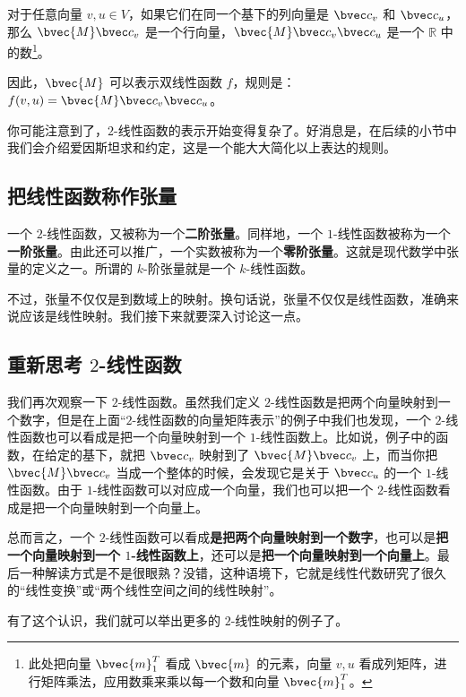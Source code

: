 对于任意向量 ${v}, {u}\in V$，如果它们在同一个基下的列向量是 $\bvec c_v$ 和 $\bvec c_u$，那么 $\bvec{M}\bvec c_v$ 是一个行向量，$\bvec{M}\bvec c_v\bvec c_u$ 是一个 $\mathbb{R}$ 中的数\footnote{此处把向量 $\bvec{m}_1^T$ 看成 $\bvec{m}$ 的元素，向量 ${v}, {u}$ 看成列矩阵，进行矩阵乘法，应用数乘来乘以每一个数和向量 $\bvec{m}_1^T$。}。

因此，$\bvec{M}$ 可以表示双线性函数 $f$，规则是：$f({v}, {u})=\bvec{M}\bvec c_v\bvec c_u$。

你可能注意到了，$2$-线性函数的表示开始变得复杂了。好消息是，在后续的小节中我们会介绍爱因斯坦求和约定，这是一个能大大简化以上表达的规则。

\subsection{把线性函数称作张量}

一个 $2$-线性函数，又被称为一个\textbf{二阶张量}。同样地，一个 $1$-线性函数被称为一个\textbf{一阶张量}。由此还可以推广，一个实数被称为一个\textbf{零阶张量}。这就是现代数学中张量的定义之一。所谓的 $k$-阶张量就是一个 $k$-线性函数。

不过，张量不仅仅是到数域上的映射。换句话说，张量不仅仅是线性函数，准确来说应该是线性映射。我们接下来就要深入讨论这一点。

\subsection{重新思考 $2$-线性函数}

我们再次观察一下 $2$-线性函数。虽然我们定义 $2$-线性函数是把两个向量映射到一个数字，但是在上面“$2$-线性函数的向量矩阵表示”的例子中我们也发现，一个 $2$-线性函数也可以看成是把一个向量映射到一个 $1$-线性函数上。比如说，例子中的函数，在给定的基下，就把 $\bvec c_v$ 映射到了 $\bvec{M}\bvec c_v$ 上，而当你把 $\bvec{M}\bvec c_v$ 当成一个整体的时候，会发现它是关于 $\bvec c_u$ 的一个 $1$-线性函数。由于 $1$-线性函数可以对应成一个向量，我们也可以把一个 $2$-线性函数看成是把一个向量映射到一个向量上。

总而言之，一个 $2$-线性函数可以看成\textbf{是把两个向量映射到一个数字}，也可以是\textbf{把一个向量映射到一个 $1$-线性函数上}，还可以是\textbf{把一个向量映射到一个向量上}。最后一种解读方式是不是很眼熟？没错，这种语境下，它就是线性代数研究了很久的“线性变换”或“两个线性空间之间的线性映射”。

有了这个认识，我们就可以举出更多的 $2$-线性映射的例子了。

